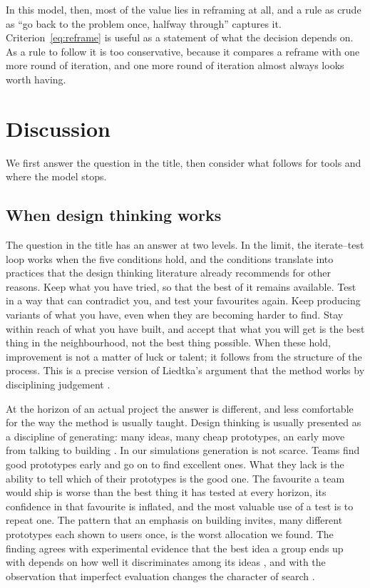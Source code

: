 \documentclass[10pt,twocolumn]{article}
\theoremstyle{definition}
\begin{document}
In this model, then, most of the value lies in reframing at all, and a rule as crude as ``go back to the problem once, halfway through'' captures it. Criterion~\eqref{eq:reframe} is useful as a statement of what the decision depends on. As a rule to follow it is too conservative, because it compares a reframe with one more round of iteration, and one more round of iteration almost always looks worth having.

\section{Discussion}
\label{sec:discussion}

We first answer the question in the title, then consider what follows for tools and where the model stops.

\subsection{When design thinking works}

The question in the title has an answer at two levels. In the limit, the iterate--test loop works when the five conditions hold, and the conditions translate into practices that the design thinking literature already recommends for other reasons. Keep what you have tried, so that the best of it remains available. Test in a way that can contradict you, and test your favourites again. Keep producing variants of what you have, even when they are becoming harder to find. Stay within reach of what you have built, and accept that what you will get is the best thing in the neighbourhood, not the best thing possible. When these hold, improvement is not a matter of luck or talent; it follows from the structure of the process. This is a precise version of Liedtka's argument that the method works by disciplining judgement \citep{liedtka2015}.

At the horizon of an actual project the answer is different, and less comfortable for the way the method is usually taught. Design thinking is usually presented as a discipline of generating: many ideas, many cheap prototypes, an early move from talking to building \citep{brown2008, dschool2010}. In our simulations generation is not scarce. Teams find good prototypes early and go on to find excellent ones. What they lack is the ability to tell which of their prototypes is the good one. The favourite a team would ship is worse than the best thing it has tested at every horizon, its confidence in that favourite is inflated, and the most valuable use of a test is to repeat one. The pattern that an emphasis on building invites, many different prototypes each shown to users once, is the worst allocation we found. The finding agrees with experimental evidence that the best idea a group ends up with depends on how well it discriminates among its ideas \citep{girotra2010}, and with the observation that imperfect evaluation changes the character of search \citep{knudsen2007}.
\end{document}
